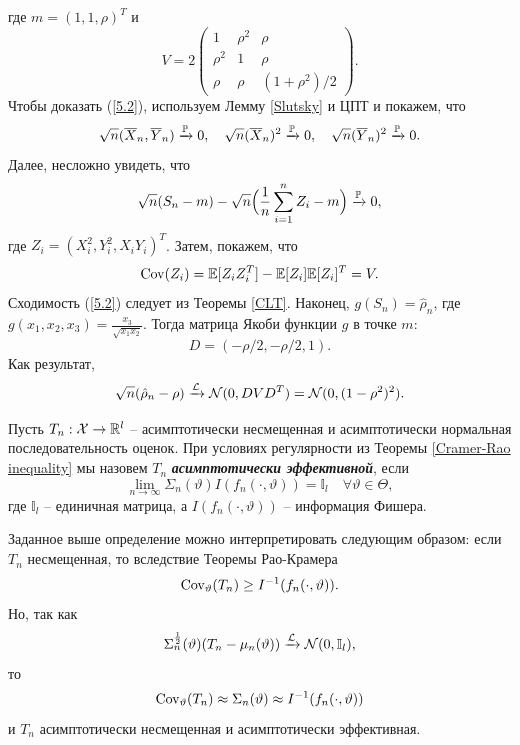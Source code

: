\begin{exmp}
\begin{enumerate}
	    где $m=(1, 1, \rho)^T$ и
	    \[ 
	    V = 2 
	    \begin{pmatrix}
	    1 & \rho^2 & \rho \\
	    \rho^2 & 1 & \rho \\
	    \rho & \rho & (1 + \rho^2)/2
	    \end{pmatrix}.
	    \]
	    Чтобы доказать (\ref{5.2}), используем Лемму \ref{Slutsky} и ЦПТ и покажем, что
	   \[ \sqrt{n}(\overline{X}_n, \overline{Y}_n) \xrightarrow{\mathbb{P}} 0, \quad \sqrt{n}(\overline{X}_n)^2 \xrightarrow{\mathbb{P}} 0, \quad \sqrt{n}(\overline{Y}_n)^2 \xrightarrow{\mathbb{P}} 0.  \]
	   Далее, несложно увидеть, что
	   \[ \sqrt{n}(S_n - m) - \sqrt{n}\Big(\frac{1}{n}\sum_{i=1}^{n}Z_i - m \Big) \xrightarrow{\mathbb{P}} 0, \]
	   где $Z_i = (X_i^2, Y_i^2, X_iY_i)^T$.
	   Затем, покажем, что
	   \[\operatorname{Cov}(Z_i) = \mathbb{E}[Z_i Z_i^T]-\mathbb{E}[Z_i]\mathbb{E}[Z_i]^T = V. \]
	   Сходимость (\ref{5.2}) следует из Теоремы \ref{CLT}. Наконец, $g(S_n)=\hat{\rho}_n$, где $g(x_1, x_2, x_3) = \frac{x_3}{\sqrt{x_1 x_2}}$. Тогда матрица Якоби функции $g$ в точке $m$:
	   \[ D = (-\rho/2, -\rho/2, 1).\]
	   Как результат,
	   \[ \sqrt{n}(\hat{\rho}_n - \rho) \xrightarrow{\mathcal{L}} \mathcal{N}(0, DVD^T) = \mathcal{N}(0, (1-\rho^2)^2). \] 
	\end{enumerate}
\end{exmp}

\begin{defn}
	Пусть $T_n: \mathcal{X} \rightarrow \mathbb{R}^l$ -- асимптотически несмещенная и асимптотически нормальная последовательность оценок. При условиях регулярности из Теоремы \ref{Cramer-Rao inequality} мы назовем $T_n$ \textbf{\textit{асимптотически эффективной}}, если
	\[ \lim\limits_{n \rightarrow \infty} \Sigma_n(\vartheta) I(f_n(\cdot, \vartheta))=\mathbb{I}_l \quad \forall \vartheta \in \Theta,  \]
	где $\mathbb{I}_l$ -- единичная матрица, а $I(f_n(\cdot, \vartheta))$ -- информация Фишера.
\end{defn}

\begin{rmrk}
	Заданное выше определение можно интерпретировать следующим образом: если $T_n$ несмещенная, то вследствие Теоремы Рао-Крамера
	\[ \operatorname{Cov}_\vartheta(T_n) \geq I^{-1}(f_n(\cdot, \vartheta)). \]
	Но, так как
	\[ \Sigma_n^{\frac{1}{2}} (\vartheta)(T_n - \mu_n(\vartheta)) \xrightarrow{\mathcal{L}} \mathcal{N}(0, \mathbb{I}_l), \]
	то
	\[ \operatorname{Cov}_\vartheta(T_n) \approx \Sigma_n(\vartheta) \approx I^{-1}(f_n(\cdot, \vartheta)) \]
	и $T_n$ асимптотически несмещенная и асимптотически эффективная. 
\end{rmrk}

